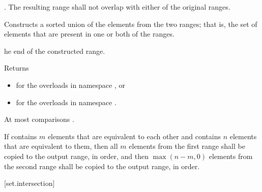 \begin{itemdescr}
\pnum
\requires
{}.
The resulting range shall not overlap with either of the original ranges.

\pnum
\effects
Constructs a sorted union of the elements from the two ranges;
that is, the set of elements that are present in one or both of the ranges.

\pnum
\returns
{}he end of the
constructed range.
\begin{addedblock}
Returns
\begin{itemize}
\item {} for the overloads in namespace , or
\item {} for the overloads in
  namespace .
\end{itemize}
\end{addedblock}

\pnum
\complexity
At most
comparisons .

\pnum
\remarks {}
If  contains $m$ elements that are equivalent to
each other and  contains $n$ elements that are equivalent
to them, then all $m$ elements from the first range shall be copied to the output
range, in order, and then  $\max(n - m, 0)$
elements from the second range shall be copied to the output range, in order.
\end{itemdescr}


[set.intersection]{}

